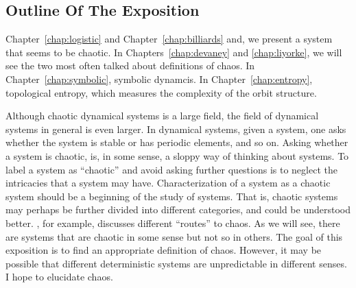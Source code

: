 \documentclass[10pt,twoside,draft]{book}
\begin{document}
\subsection*{Outline Of The Exposition}
Chapter~\ref{chap:logistic} and Chapter~\ref{chap:billiards} and, we present a system that seems to be chaotic.
In Chapters~\ref{chap:devaney} and \ref{chap:liyorke}, we will see the two most often talked about definitions of chaos.
In Chapter~\ref{chap:symbolic}, symbolic dynamcis.
In Chapter~\ref{chap:entropy}, topological entropy, which measures the complexity of the orbit structure.

Although chaotic dynamical systems is a large field, the field of dynamical systems in general is even larger.
In dynamical systems, given a system, one asks whether the system is stable or has periodic elements, and so on.
Asking whether a system is chaotic, is, in some sense, a sloppy way of thinking about systems.
To label a system as ``chaotic'' and avoid asking further questions is to neglect the intricacies that a system may have.
Characterization of a system as a chaotic system should be a beginning of the study of systems.
That is, chaotic systems may perhaps be further divided into different categories, and could be understood better.
\citet{devaney}, for example, discusses different ``routes'' to chaos.
As we will see, there are systems that are chaotic in some sense but not so in others.
The goal of this exposition is to find an appropriate definition of chaos.
However, it may be possible that different deterministic systems are unpredictable in different senses.
I hope to elucidate chaos.



\end{document}
